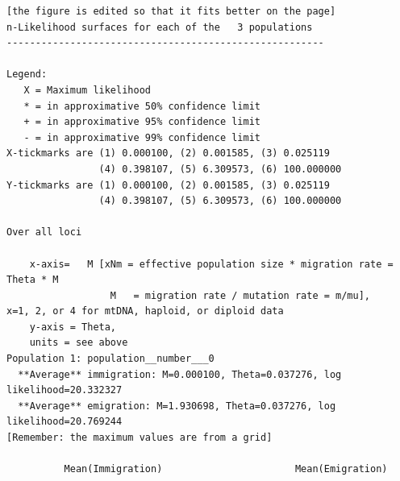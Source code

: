 \begin{center}
\begin{boxedminipage}{6.5in}
\begin{small}
\begin{tt}
\begin{verbatim}
[the figure is edited so that it fits better on the page]
n-Likelihood surfaces for each of the   3 populations
-------------------------------------------------------

Legend:
   X = Maximum likelihood
   * = in approximative 50% confidence limit
   + = in approximative 95% confidence limit
   - = in approximative 99% confidence limit
X-tickmarks are (1) 0.000100, (2) 0.001585, (3) 0.025119
                (4) 0.398107, (5) 6.309573, (6) 100.000000
Y-tickmarks are (1) 0.000100, (2) 0.001585, (3) 0.025119
                (4) 0.398107, (5) 6.309573, (6) 100.000000

Over all loci

    x-axis=   M [xNm = effective population size * migration rate = Theta * M
                  M   = migration rate / mutation rate = m/mu],
x=1, 2, or 4 for mtDNA, haploid, or diploid data
    y-axis = Theta,
    units = see above
Population 1: population__number___0
  **Average** immigration: M=0.000100, Theta=0.037276, log likelihood=20.332327
  **Average** emigration: M=1.930698, Theta=0.037276, log likelihood=20.769244
[Remember: the maximum values are from a grid]

          Mean(Immigration)                       Mean(Emigration)


\end{verbatim}
\end{tt}
\end{small}
\end{boxedminipage}
\end{center}
